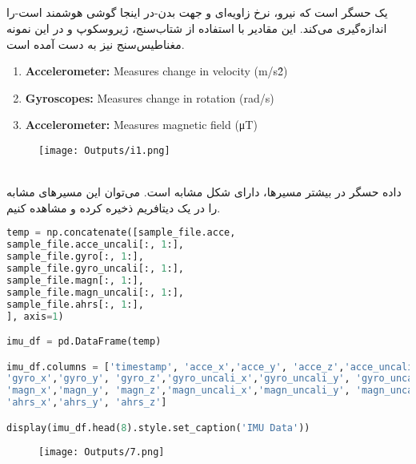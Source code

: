 \documentclass{article}
\begin{document}
\subsection*{}
 یک حسگر است که نیرو، نرخ زاویه‌ای و جهت بدن-در اینجا گوشی هوشمند است-را اندازه‌گیری می‌کند. این مقادیر با استفاده از شتاب‌سنج، ژیروسکوپ و در این نمونه مغناطیس‌سنج نیز به دست آمده است.
\begin{flushleft}
\begin{latin}
\begin{enumerate}
	\item
	\textbf{Accelerometer:} Measures change in velocity (m/s\^2)
	\item
	\textbf{Gyroscopes:} Measures change in rotation (rad/s)
	\item 
	\textbf{Accelerometer:} Measures magnetic field (μT)
\end{enumerate}
\end{latin}
\end{flushleft}
\begin{figure}[hbt!]
	\centering
	\texttt{[image: Outputs/i1.png]}
\end{figure}
\ \\
داده حسگر  در بیشتر مسیر‌ها، دارای شکل مشابه است. می‌توان این مسیر‌های مشابه را در یک دیتافریم  ذخیره کرده و مشاهده کنیم.
\begin{latin}
\begin{lstlisting}[language=Python]
temp = np.concatenate([sample_file.acce, 
sample_file.acce_uncali[:, 1:],
sample_file.gyro[:, 1:],
sample_file.gyro_uncali[:, 1:],
sample_file.magn[:, 1:],
sample_file.magn_uncali[:, 1:],
sample_file.ahrs[:, 1:],
], axis=1)

imu_df = pd.DataFrame(temp)

imu_df.columns = ['timestamp', 'acce_x','acce_y', 'acce_z','acce_uncali_x','acce_uncali_y', 'acce_uncali_z',
'gyro_x','gyro_y', 'gyro_z','gyro_uncali_x','gyro_uncali_y', 'gyro_uncali_z',
'magn_x','magn_y', 'magn_z','magn_uncali_x','magn_uncali_y', 'magn_uncali_z',
'ahrs_x','ahrs_y', 'ahrs_z']

display(imu_df.head(8).style.set_caption('IMU Data'))
\end{lstlisting}
\end{latin}
\begin{figure}[hbt!]
	\centering
	\texttt{[image: Outputs/7.png]}
\end{figure}
\ \\
\end{document}
